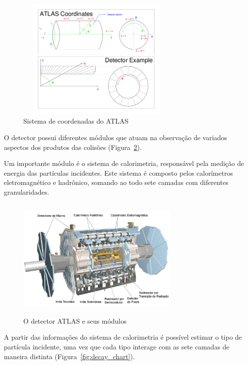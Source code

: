 \documentclass[a4paper,10pt,titlepage]{article}
\begin{document}
\begin{figure}[htbp!]
 \centering
 \includegraphics[width=8cm,height=6cm]{Figs/atlas/atlas_coords.png}
 \caption{Sistema de coordenadas do ATLAS}
 \label{fig:atlas_coords}
\end{figure}

O detector possui diferentes módulos que atuam na observação de variados aspectos dos produtos das colisões (Figura~\ref{fig:atlas_detector}).

Um importante módulo é o sistema de calorimetria, responsável pela medição de energia das partículas incidentes.
Este sistema é composto pelos calorímetros eletromagnético e hadrônico, somando ao todo sete camadas com diferentes granularidades.

\begin{figure}[htbp!]
 \centering
 \includegraphics[width=8cm,height=6cm]{Figs/atlas/atlas_detector.pdf}
 \caption{O detector ATLAS e seus módulos}
 \label{fig:atlas_detector}
\end{figure}

A partir das informações do sistema de calorimetria é possível estimar o tipo de partícula incidente, uma vez que cada tipo interage com as sete camadas de maneira distinta (Figura~\ref{fig:decay_chart}).
\end{document}

